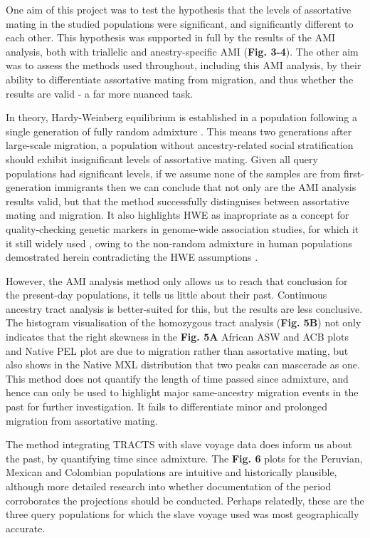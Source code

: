 \documentclass[11pt]{article}
\begin{document}
One aim of this project was to test the hypothesis that the levels of assortative mating in the studied populations were significant, and significantly different to each other. This hypothesis was supported in full by the results of the AMI analysis, both with triallelic and anestry-specific AMI (\textbf{Fig. 3-4}). The other aim was to assess the methods used throughout, including this AMI analysis, by their ability to differentiate assortative mating from migration, and thus whether the results are valid - a far more nuanced task.

In theory, Hardy-Weinberg equilibrium is established in a population following a single generation of fully random admixture \parencite{Smithjohn2015}. This means two generations after large-scale migration, a population without ancestry-related social stratification should exhibit insignificant levels of assortative mating. Given all query populations had significant levels, if we assume none of the samples are from first-generation immigrants then we can conclude that not only are the AMI analysis results valid, but that the method successfully distinguises between assortative mating and migration. It also highlights HWE as inapropriate as a concept for quality-checking genetic markers in genome-wide association studies, for which it it still widely used \parencite{Linares-Pineda2012}, owing to the non-random admixture in human populations demostrated herein contradicting the HWE assumptions \parencite{Smithjohn2015}.

However, the AMI analysis method only allows us to reach that conclusion for the present-day populations, it tells us little about their past. Continuous ancestry tract analysis is better-suited for this, but the results are less conclusive. The histogram visualisation of the homozygous tract analysis (\textbf{Fig. 5B}) not only indicates that the right skewness in the \textbf{Fig. 5A} African ASW and ACB plots and Native PEL plot are due to migration rather than assortative mating, but also shows in the Native MXL distribution that two peaks can mascerade as one. This method does not quantify the length of time passed since admixture, and hence can only be used to highlight major same-ancestry migration events in the past for further investigation. It fails to differentiate minor and prolonged migration from assortative mating. 

The method integrating TRACTS with slave voyage data does inform us about the past, by quantifying time since admixture. The \textbf{Fig. 6} plots for the Peruvian, Mexican and Colombian populations are intuitive and historically plausible, although more detailed research into whether documentation of the period corroborates the projections should be conducted. Perhaps relatedly, these are the three query populations for which the slave voyage used was most geographically accurate.
\end{document}
